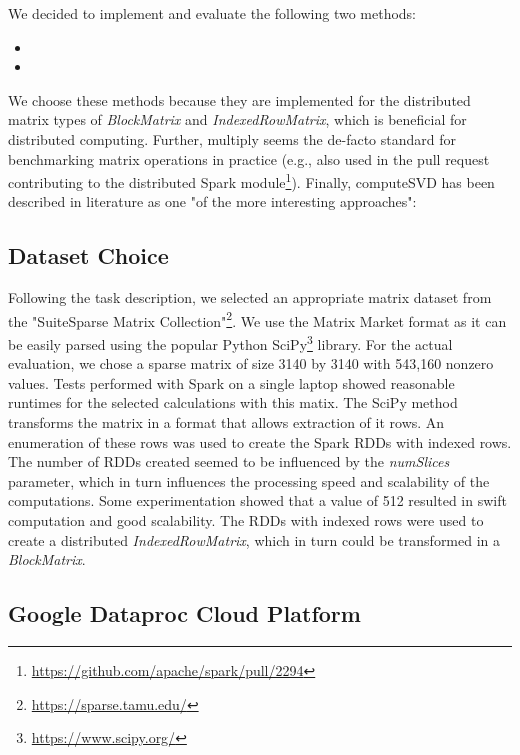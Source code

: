 \documentclass{prog_report}
\newcommand{\footurl}[1]{\footnote{\url{#1}}}
\begin{document}
We decided to implement and evaluate the following two methods:
\begin{itemize}
    \item {}
    \item {}
\end{itemize}
We choose these methods because they are implemented for the distributed matrix types of \emph{BlockMatrix} and \emph{IndexedRowMatrix}, which is beneficial for distributed computing.
Further, multiply seems the de-facto standard for benchmarking matrix operations in practice (e.g., also used in the pull request contributing to the distributed Spark module\footurl{https://github.com/apache/spark/pull/2294}).
Finally, computeSVD has been described in literature as one "of the more interesting approaches"\cite{bosagh-zadeh:16}:

\subsection{Dataset Choice}

Following the task description, we selected an appropriate matrix dataset from the "SuiteSparse Matrix Collection"\footurl{https://sparse.tamu.edu/}.
We use the  Matrix Market format as it can be easily parsed using the popular Python SciPy\footurl{https://www.scipy.org/} library.
For the actual evaluation, we chose a sparse matrix of size 3140 by 3140 with 543,160 nonzero values. 
Tests performed with Spark on a single laptop showed reasonable runtimes for the selected calculations with this matix.
The SciPy method  transforms the matrix in a format that allows extraction of it rows. 
An enumeration of these rows was used to create the Spark RDDs with indexed rows. 
The number of RDDs created seemed to be influenced by the \emph{numSlices} parameter, which in turn influences the processing speed and scalability of the computations.
Some experimentation showed that a value of 512 resulted in swift computation and good scalability.
The RDDs with indexed rows were used to create a distributed \emph{IndexedRowMatrix}, which in turn could be transformed in a \emph{BlockMatrix}. 



\subsection{Google Dataproc Cloud Platform}
\end{document}
